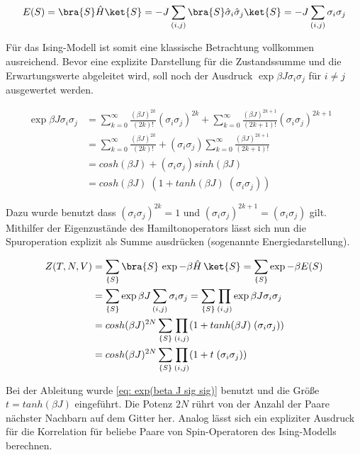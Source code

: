 \begin{equation} \label{Ising_Eigenenergie}
E(S) = \bra{S}\hat{H}\ket{S} = - J  \sum_{(i,j)} \bra{S}\hat{\sigma}_i \hat{\sigma}_j\ket{S} =- J  \sum_{(i,j)} \sigma_i \sigma_j
\end{equation}

\noindent Für das Ising-Modell ist somit eine klassische Betrachtung vollkommen ausreichend. Bevor eine explizite Darstellung für die Zustandssumme und die Erwartungswerte abgeleitet wird, soll noch der Ausdruck $\exp{\beta J \sigma_i \sigma_j} $ für $i \neq j$ ausgewertet werden. 

\begin{align}
\exp{\beta J \sigma_i \sigma_j} & = \sum_{k=0}^{\infty} \frac{(\beta J)^{2k}}{(2k)!}(\sigma_i \sigma_j)^{2k} + \sum_{k=0}^{\infty} \frac{(\beta J)^{2k+1}}{(2k+1)!}(\sigma_i \sigma_j)^{2k+1}  &\\
& = \sum_{k=0}^{\infty} \frac{(\beta J)^{2k}}{(2k)!} + (\sigma_i \sigma_j) \sum_{k=0}^{\infty} \frac{(\beta J)^{2k+1}}{(2k+1)!} &\\
& = cosh(\beta J) + (\sigma_i \sigma_j) sinh(\beta J) &\\
& = cosh(\beta J) \; (1 +  tanh(\beta J) \; (\sigma_i \sigma_j)) \label{eq: exp(beta J sig sig)}
\end{align}

\noindent Dazu wurde benutzt dass $(\sigma_i \sigma_j)^{2k} = 1$ und $(\sigma_i \sigma_j)^{2k+1} = (\sigma_i \sigma_j)$ gilt. Mithilfer der Eigenzustände des Hamiltonoperators lässt sich nun die Spuroperation explizit als Summe ausdrücken (sogenannte Energiedarstellung).

\begin{align} 
    Z(T,N,V)  
    & = \sum_{\{S\}} \bra{S}\,\exp{-\beta \hat{H} }\,\ket{S} 
      = \sum_{\{S\}} \exp{-\beta E( S ) } \\
    & = \sum_{\{S\}} \exp{\beta J \sum_{(i,j)} \sigma_i \sigma_j } 
      = \sum_{\{S\}} \prod_{(i,j)} \exp{\beta J \sigma_i \sigma_j } \\
    & = cosh(\beta J)^{2N} \sum_{\{S\}} \prod_{(i,j)} (1 +  tanh(\beta J) \; (\sigma_i \sigma_j)) \\
    & = cosh(\beta J)^{2N} \sum_{\{S\}} \prod_{(i,j)} (1 +  t \; (\sigma_i \sigma_j))
\end{align}

\noindent Bei der Ableitung wurde \eqref{eq: exp(beta J sig sig)} benutzt und die Größe $t = tanh(\beta J)$ eingeführt. Die Potenz $2N$ rührt von der Anzahl der Paare nächster Nachbarn auf dem Gitter her.
Analog lässt sich ein expliziter Ausdruck für die Korrelation für beliebe Paare von Spin-Operatoren des Ising-Modells berechnen.

